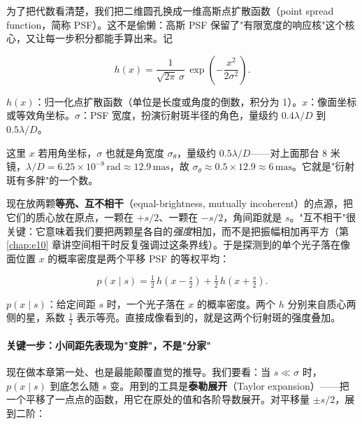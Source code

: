 为了把代数看清楚，我们把二维圆孔换成一维高斯点扩散函数（point spread function，简称 PSF）。这不是偷懒：高斯 PSF 保留了"有限宽度的响应核"这个核心，又让每一步积分都能手算出来。记

\begin{equation}
  h(x)=\frac{1}{\sqrt{2\pi}\,\sigma}\,
       \exp\!\left(-\frac{x^{2}}{2\sigma^{2}}\right).
  \label{eq:e12-gaussian-psf}
\end{equation}
\begin{formulaexplain}
\(h(x)\)：归一化点扩散函数（单位是长度或角度的倒数，积分为 1）。\(x\)：像面坐标或等效角坐标。\(\sigma\)：PSF 宽度，扮演衍射斑半径的角色，量级约 \(0.4\lambda/D\) 到 \(0.5\lambda/D\)。
\end{formulaexplain}

这里 \(x\) 若用角坐标，\(\sigma\) 也就是角宽度 \(\sigma_\theta\)，量级约 \(0.5\lambda/D\)——对上面那台 8 米镜，\(\lambda/D=6.25\times10^{-8}\,\mathrm{rad}\approx12.9\,\mathrm{mas}\)，故 \(\sigma_\theta\approx0.5\times12.9\approx6\,\mathrm{mas}\)。它就是"衍射斑有多胖"的一个数。

现在放两颗\textbf{等亮、互不相干}（equal-brightness, mutually incoherent）的点源，把它们的质心放在原点，一颗在 \(+s/2\)、一颗在 \(-s/2\)，角间距就是 \(s\)。"互不相干"很关键：它意味着我们要把两颗星各自的\emph{强度}相加，而不是把振幅相加再平方（第 \ref{chap:e10} 章讲空间相干时反复强调过这条界线）。于是探测到的单个光子落在像面位置 \(x\) 的概率密度是两个平移 PSF 的等权平均：

\begin{equation}
  p(x\mid s)=\tfrac12\,h\!\left(x-\tfrac{s}{2}\right)
            +\tfrac12\,h\!\left(x+\tfrac{s}{2}\right).
  \label{eq:e12-direct-prob}
\end{equation}
\begin{formulaexplain}
\(p(x\mid s)\)：给定间距 \(s\) 时，一个光子落在 \(x\) 的概率密度。两个 \(h\) 分别来自质心两侧的星，系数 \(\tfrac12\) 表示等亮。直接成像看到的，就是这两个衍射斑的强度叠加。
\end{formulaexplain}

\paragraph{关键一步：小间距先表现为"变胖"，不是"分家"}
\label{sec:e12-taylor}

现在做本章第一处、也是最能颠覆直觉的推导。我们要看：当 \(s\ll\sigma\) 时，\(p(x\mid s)\) 到底怎么随 \(s\) 变。用到的工具是\textbf{泰勒展开}（Taylor expansion）——把一个平移了一点点的函数，用它在原处的值和各阶导数展开。对平移量 \(\pm s/2\)，展到二阶：

